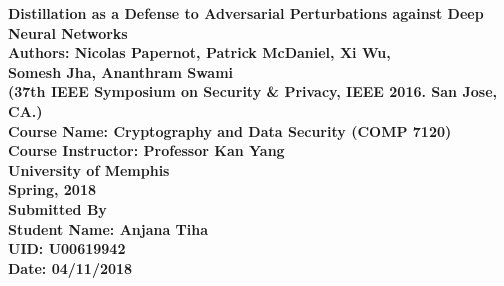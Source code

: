 \documentclass[12pt]{article}
\begin{document}
	\begin{titlepage}
		
		\begin{center}
			\begin{large}
			\vspace*{2em}
			\textbf{
			{\Large Distillation as a Defense to Adversarial
Perturbations against Deep Neural Networks}\\
			\vspace*{1.5em}
			{\small Authors: Nicolas Papernot, Patrick McDaniel, Xi Wu,\\ Somesh Jha, Ananthram Swami}\\
			{\small (37th IEEE Symposium on Security \& Privacy, IEEE 2016. San Jose, CA.)}\\
			\vspace{3em}
			Course Name: Cryptography and Data Security (COMP 7120)\\
			\vspace*{0.5em}
			Course Instructor: Professor Kan Yang\\
			\vspace{0.5em}
			University of Memphis\\
			\vspace{0.5em}
			Spring, 2018\\
			\vspace{3.5em}
			Submitted By\\
			\vspace{1em}
			Student Name: Anjana Tiha\\
			UID: U00619942\\
			Date: 04/11/2018\\
			}
			\end{large}

		\end{center}
		
	\end{titlepage}
	\newpage
	
	

\end{document}
